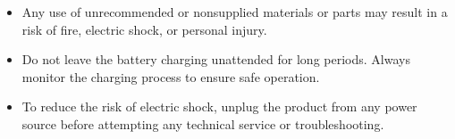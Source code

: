 \documentclass[a4paper,10pt,twoside,openany,english]{sphinxhowto}
\begin{document}
\begin{safetytwocol}
\begin{itemize}
\item {} 
\sphinxAtStartPar
Any use of unrecommended or non\sphinxhyphen{}supplied materials or parts may result in a risk of fire, electric shock, or personal injury.

\item {} 
\sphinxAtStartPar
Do not leave the battery charging unattended for long periods. Always monitor the charging process to ensure safe operation.

\item {} 
\sphinxAtStartPar
To reduce the risk of electric shock, unplug the product from any power source before attempting any technical service or troubleshooting.

\end{itemize}

\end{safetytwocol}

\end{document}
